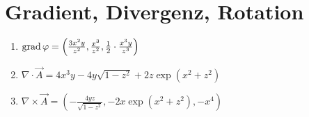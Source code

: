 \documentclass[sectionformat=aufgabe]{gadsescript}
\begin{document}
\maketitle
\section{Gradient, Divergenz, Rotation}
\begin{enumerate}[label=\alph*)]
	\item $ \operatorname{grad} \varphi = \left( \frac{ 3x^2y }{ z^2 }, \frac{ x^3 }{ z^2 }, \frac{ 1 }{ 2 } \cdot \frac{ x^3 y }{ z^3 }\right) $
	\item $ \nabla \cdot \vec A = 4x^3y - 4y\sqrt{1-z^2} + 2z \exp(x^2+z^2)  $
	\item $ \nabla \times \vec A = \left( - \frac{ 4yz }{ \sqrt{1 - z^2}  }, - 2x \exp(x^2 + z^2), -x^4\right) $
\end{enumerate}
\end{document}
